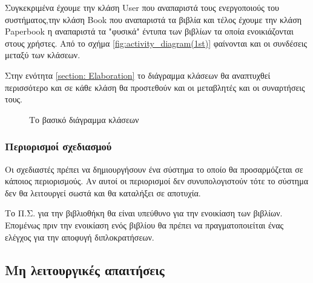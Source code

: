 \documentclass{assignment}
\begin{document}
Συγκεκριμένα έχουμε την κλάση User που αναπαριστά τους ενεργοποιούς του συστήματος,την κλάση Book που αναπαριστά τα βιβλία και τέλος έχουμε την κλάση Paperbook η αναπαριστά τα "φυσικά" έντυπα των βιβλίων τα οποία ενοικιάζονται στους χρήστες. Από το σχήμα \ref{fig:activity_diagram(1st)} φαίνονται και οι συνδέσεις μεταξύ των κλάσεων.

Στην ενότητα \ref{section: Elaboration} το διάγραμμα κλάσεων θα αναπτυχθεί περισσότερο και σε κάθε κλάση θα προστεθούν και οι μεταβλητές και οι συναρτήσεις τους.

\begin{figure}
\begin{center}
\caption{Το βασικό διάγραμμα κλάσεων}
\label{fig:basic_class_diagramm}
\end{center}
\end{figure}



\subsubsection{Περιορισμοί σχεδιασμού}

Οι σχεδιαστές πρέπει να δημιουργήσουν ένα σύστημα το οποίο θα προσαρμόζεται σε κάποιος περιορισμούς. Αν αυτοί οι περιορισμοί δεν συνυπολογιστούν τότε το σύστημα δεν θα λειτουργεί σωστά και θα καταλήξει σε αποτυχία. 

Το Π.Σ. για την βιβλιοθήκη θα είναι υπεύθυνο για την ενοικίαση των βιβλίων. Επομένως πριν την ενοικίαση ενός βιβλίου θα πρέπει να πραγματοποιείται ένας ελέγχος για την αποφυγή διπλοκρατήσεων.

\subsection{Μη λειτουργικές απαιτήσεις}
\end{document}
